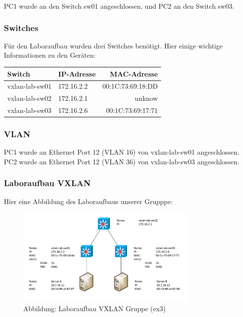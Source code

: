\documentclass[a4,12pt]{scrartcl}
\begin{document}
\noindent PC1 wurde an den Switch sw01 angeschlossen, und PC2 an den Switch sw03. 

\subsubsection{Switches}
Für den Laboraufbau wurden drei Switches benötigt. Hier einige wichtige Informationen zu den Geräten: 
\begin{center}
    \begin{tabular}{@{} l l r@{}}\toprule    
    {Switch} & {IP-Adresse} & {MAC-Adresse}\\ \midrule
    vxlan-lab-sw01 & 172.16.2.2 & 00:1C:73:69:18:DD\\ \addlinespace
    vxlan-lab-sw02 & 172.16.2.1 & unknow\\ \addlinespace
    vxlan-lab-sw03 & 172.16.2.6 & 00:1C:73:69:17:71\\
    \bottomrule
    \end{tabular}
\end{center}

\subsubsection{VLAN}
PC1 wurde an Ethernet Port 12 (VLAN 16) von vxlan-lab-sw01 angeschlossen. PC2 wurde an Ethernet Port 12 (VLAN 36) von vxlan-lab-sw03 angeschlossen. 

\subsubsection{Laboraufbau VXLAN}
Hier eine Abbildung des Laboraufbaus unserer Grupppe: 
\begin{figure} [H]
	\begin{center}
	\includegraphics[width=0.80\textwidth]{./draws/vxlan_ex3_laboraufbau.pdf}
	\caption{Abbildung: Laboraufbau VXLAN Gruppe (ex3)}
	\label{x}
	\end{center}
\end{figure}
\end{document}
